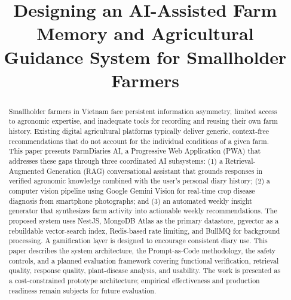 \documentclass[conference]{IEEEtran}
\begin{document}
\title{Designing an AI-Assisted Farm Memory and Agricultural Guidance System for Smallholder Farmers}

\author{
\and
{}
\and
{}
\and
{}
}

\maketitle

\begin{abstract}
Smallholder farmers in Vietnam face persistent information asymmetry, limited access to agronomic expertise, and inadequate tools for recording and reusing their own farm history. Existing digital agricultural platforms typically deliver generic, context-free recommendations that do not account for the individual conditions of a given farm. This paper presents FarmDiaries AI, a Progressive Web Application (PWA) that addresses these gaps through three coordinated AI subsystems: (1) a Retrieval-Augmented Generation (RAG) conversational assistant that grounds responses in verified agronomic knowledge combined with the user's personal diary history; (2) a computer vision pipeline using Google Gemini Vision for real-time crop disease diagnosis from smartphone photographs; and (3) an automated weekly insight generator that synthesizes farm activity into actionable weekly recommendations. The proposed system uses NestJS, MongoDB Atlas as the primary datastore, pgvector as a rebuildable vector-search index, Redis-based rate limiting, and BullMQ for background processing. A gamification layer is designed to encourage consistent diary use. This paper describes the system architecture, the Prompt-as-Code methodology, the safety controls, and a planned evaluation framework covering functional verification, retrieval quality, response quality, plant-disease analysis, and usability. The work is presented as a cost-constrained prototype architecture; empirical effectiveness and production readiness remain subjects for future evaluation.
\end{abstract}
\end{document}
